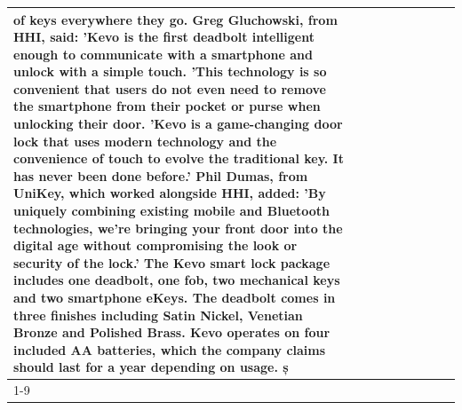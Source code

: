 \begin{table}[H]
\begin{tabular}{lllrlllll}
of keys everywhere they go. Greg Gluchowski, from HHI, said: 'Kevo is the first deadbolt intelligent enough to communicate with a smartphone and unlock with a simple touch. 'This technology is so convenient that users do not even need to remove the smartphone from their pocket or purse when unlocking their door. 'Kevo is a game-changing door lock that uses modern technology and the convenience of touch to evolve the traditional key. It has never been done before.' Phil Dumas, from UniKey, which worked alongside HHI, added: 'By uniquely combining existing mobile and Bluetooth technologies, we’re bringing your front door into the digital age without compromising the look or security of the lock.' The Kevo smart lock package includes one deadbolt, one fob, two mechanical keys and two smartphone eKeys. The deadbolt comes in three finishes including Satin Nickel, Venetian Bronze and Polished Brass. Kevo operates on four included AA batteries, which the company claims should last for a year depending on usage. ș \\
\cline{1-9}

\end{tabular}
\end{table}
